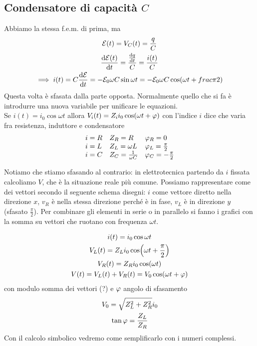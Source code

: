\subsection{Condensatore di capacità $C$}
Abbiamo la stessa f.e.m. di prima, ma 
\begin{gather*}
	\mathcal{E}(t)=V_C(t)=\frac{q}{C}\\
	\dv{\mathcal{E}(t)}{t}=\frac{\dv{q}{t}}{C}=\frac{i(t)}{C}\\
	\implies i(t)=C\dv{\mathcal{E}}{t}=-\mathcal{E}_0\omega C\sin\omega t= -\mathcal{E}_0\omega C\cos(\omega t+frac{\pi}{2})
\end{gather*}
Questa volta è sfasata dalla parte opposta. 
Normalmente quello che si fa è introdurre una nuova variabile per unificare le equazioni.\\
Se $i(t)=i_0\cos\omega t$ allora $V_i(t)=Z_ii_0\cos(\omega t+\oldphi)$
con l'indice $i$ dice che varia fra resistenza, induttore e condensatore
\begin{gather*}
	\begin{array}{lll}
		i=R & Z_R=R & \oldphi_R=0\\
		i=L & Z_L=\omega L	& \oldphi_L=\frac{\pi}{2}\\
		i=C & Z_C=\frac{1}{\omega C} & \oldphi_C=-\frac{\pi}{2}
	\end{array}
\end{gather*}

Notiamo che stiamo sfasando al contrario: %
in elettrotecnica partendo da $i$ fissata calcoliamo $V$, che è la situazione reale più comune. Possiamo rappresentare come dei vettori secondo il seguente schema
disegni: $i$ come vettore diretto nella direzione $x$, $v_R$ è nella stessa direzione perché è in fase, $v_L$ è in direzione $y$ (sfasato $\frac{\pi}{2}$).
Per combinare gli elementi in serie o in parallelo si fanno i grafici con la somma su vettori che ruotano con frequenza $\omega t$.

\begin{examplewt}[AC, RL, in serie]
	\begin{gather*}
		i(t)=i_0\cos\omega t\\
		V_L(t)=Z_Li_0\cos(\omega t+\frac{\pi}{2})\\
		V_R(t)=Z_R i_0\cos(\omega t)\\
		V(t)=V_L(t) +V_R(t)= V_0\cos(\omega t+\oldphi)	
	\end{gather*}
	con modulo somma dei vettori (?) e $\oldphi$ angolo di sfasamento
	\begin{gather*}
		V_0=\sqrt{Z_L^2 +Z_R^2} i_0\\
		\tan\oldphi=\frac{Z_L}{Z_R}
	\end{gather*}
	Con il calcolo simbolico vedremo come semplificarlo con i numeri complessi.
\end{examplewt}

